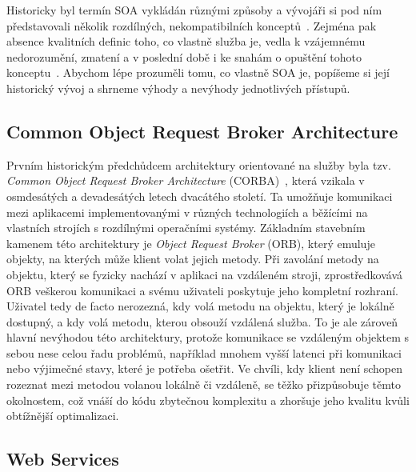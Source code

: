 Historicky byl termín \gls{SOA} vykládán různými způsoby a vývojáři si
pod ním představovali několik rozdílných, nekompatibilních
konceptů~\cite{fowler2005serviceorientedambiguity}.
Zejména pak absence kvalitních definic toho, co vlastně
služba je, vedla k vzájemnému nedorozumění, zmatení a v poslední
době i ke snahám o opuštění tohoto konceptu~\cite{cerny2017disambiguation}.
Abychom lépe prozuměli tomu, co vlastně \gls{SOA} je, popíšeme si její historický
vývoj a shrneme výhody a nevýhody jednotlivých přístupů.

\subsection{Common Object Request Broker Architecture}

Prvním historickým předchůdcem architektury orientované na služby
byla tzv. \textit{Common Object Request Broker Architecture}
(\gls{CORBA})~\cite{siegel2000corba}, která vzikala v osmdesátých a devadesátých letech
dvacátého století. Ta umožňuje komunikaci mezi aplikacemi implementovanými v
různých technologiích a běžícími na vlastních strojích s rozdílnými
operačními systémy. Základním stavebním kamenem této architektury
je \textit{Object Request Broker} (\gls{ORB}), který emuluje objekty,
na kterých může klient volat jejich metody. Při zavolání metody
na objektu, který se fyzicky nachází v aplikaci na vzdáleném stroji,
zprostředkovává \gls{ORB} veškerou komunikaci a svému uživateli poskytuje
jeho kompletní rozhraní. Uživatel tedy de facto nerozezná, kdy volá
metodu na objektu, který je lokálně dostupný,
a kdy volá metodu, kterou obsouží vzdálená služba. To je ale zároveň
hlavní nevýhodou této architektury, protože komunikace se vzdáleným
objektem s sebou nese celou řadu problémů, například mnohem vyšší latenci
při komunikaci nebo výjimečné stavy, které je potřeba ošetřit. Ve chvíli,
kdy klient není schopen rozeznat mezi metodou volanou lokálně či vzdáleně,
se těžko přizpůsobuje těmto okolnostem, což vnáší do kódu zbytečnou
komplexitu a zhoršuje jeho kvalitu kvůli obtížnější optimalizaci.

\subsection{Web Services}


